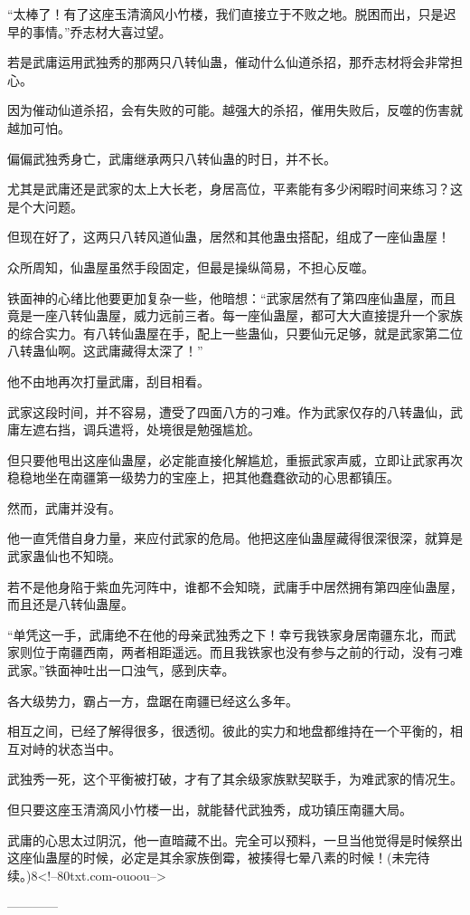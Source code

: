 \begin{this_body}
“太棒了！有了这座玉清滴风小竹楼，我们直接立于不败之地。脱困而出，只是迟早的事情。”乔志材大喜过望。

若是武庸运用武独秀的那两只八转仙蛊，催动什么仙道杀招，那乔志材将会非常担心。

因为催动仙道杀招，会有失败的可能。越强大的杀招，催用失败后，反噬的伤害就越加可怕。

偏偏武独秀身亡，武庸继承两只八转仙蛊的时日，并不长。

尤其是武庸还是武家的太上大长老，身居高位，平素能有多少闲暇时间来练习？这是个大问题。

但现在好了，这两只八转风道仙蛊，居然和其他蛊虫搭配，组成了一座仙蛊屋！

众所周知，仙蛊屋虽然手段固定，但最是操纵简易，不担心反噬。

铁面神的心绪比他要更加复杂一些，他暗想：“武家居然有了第四座仙蛊屋，而且竟是一座八转仙蛊屋，威力远前三者。每一座仙蛊屋，都可大大直接提升一个家族的综合实力。有八转仙蛊屋在手，配上一些蛊仙，只要仙元足够，就是武家第二位八转蛊仙啊。这武庸藏得太深了！”

他不由地再次打量武庸，刮目相看。

武家这段时间，并不容易，遭受了四面八方的刁难。作为武家仅存的八转蛊仙，武庸左遮右挡，调兵遣将，处境很是勉强尴尬。

但只要他甩出这座仙蛊屋，必定能直接化解尴尬，重振武家声威，立即让武家再次稳稳地坐在南疆第一级势力的宝座上，把其他蠢蠢欲动的心思都镇压。

然而，武庸并没有。

他一直凭借自身力量，来应付武家的危局。他把这座仙蛊屋藏得很深很深，就算是武家蛊仙也不知晓。

若不是他身陷于紫血先河阵中，谁都不会知晓，武庸手中居然拥有第四座仙蛊屋，而且还是八转仙蛊屋。

“单凭这一手，武庸绝不在他的母亲武独秀之下！幸亏我铁家身居南疆东北，而武家则位于南疆西南，两者相距遥远。而且我铁家也没有参与之前的行动，没有刁难武家。”铁面神吐出一口浊气，感到庆幸。

各大级势力，霸占一方，盘踞在南疆已经这么多年。

相互之间，已经了解得很多，很透彻。彼此的实力和地盘都维持在一个平衡的，相互对峙的状态当中。

武独秀一死，这个平衡被打破，才有了其余级家族默契联手，为难武家的情况生。

但只要这座玉清滴风小竹楼一出，就能替代武独秀，成功镇压南疆大局。

武庸的心思太过阴沉，他一直暗藏不出。完全可以预料，一旦当他觉得是时候祭出这座仙蛊屋的时候，必定是其余家族倒霉，被揍得七晕八素的时候！(未完待续。)8<!--80txt.com-ouoou-->

------------

\end{this_body}

